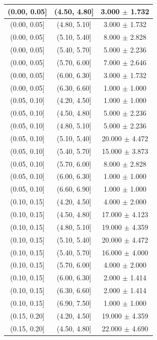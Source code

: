 \begin{longtable}{|c|c|c|}
\hline
\endlastfoot
(0.00, 0.05] & (4.50, 4.80] & 3.000 $\pm$ 1.732 \\ 
\hline
(0.00, 0.05] & (4.80, 5.10] & 3.000 $\pm$ 1.732 \\ 
\hline
(0.00, 0.05] & (5.10, 5.40] & 8.000 $\pm$ 2.828 \\ 
\hline
(0.00, 0.05] & (5.40, 5.70] & 5.000 $\pm$ 2.236 \\ 
\hline
(0.00, 0.05] & (5.70, 6.00] & 7.000 $\pm$ 2.646 \\ 
\hline
(0.00, 0.05] & (6.00, 6.30] & 3.000 $\pm$ 1.732 \\ 
\hline
(0.00, 0.05] & (6.30, 6.60] & 1.000 $\pm$ 1.000 \\ 
\hline
(0.05, 0.10] & (4.20, 4.50] & 1.000 $\pm$ 1.000 \\ 
\hline
(0.05, 0.10] & (4.50, 4.80] & 5.000 $\pm$ 2.236 \\ 
\hline
(0.05, 0.10] & (4.80, 5.10] & 5.000 $\pm$ 2.236 \\ 
\hline
(0.05, 0.10] & (5.10, 5.40] & 20.000 $\pm$ 4.472 \\ 
\hline
(0.05, 0.10] & (5.40, 5.70] & 15.000 $\pm$ 3.873 \\ 
\hline
(0.05, 0.10] & (5.70, 6.00] & 8.000 $\pm$ 2.828 \\ 
\hline
(0.05, 0.10] & (6.00, 6.30] & 1.000 $\pm$ 1.000 \\ 
\hline
(0.05, 0.10] & (6.60, 6.90] & 1.000 $\pm$ 1.000 \\ 
\hline
(0.10, 0.15] & (4.20, 4.50] & 4.000 $\pm$ 2.000 \\ 
\hline
(0.10, 0.15] & (4.50, 4.80] & 17.000 $\pm$ 4.123 \\ 
\hline
(0.10, 0.15] & (4.80, 5.10] & 19.000 $\pm$ 4.359 \\ 
\hline
(0.10, 0.15] & (5.10, 5.40] & 20.000 $\pm$ 4.472 \\ 
\hline
(0.10, 0.15] & (5.40, 5.70] & 16.000 $\pm$ 4.000 \\ 
\hline
(0.10, 0.15] & (5.70, 6.00] & 4.000 $\pm$ 2.000 \\ 
\hline
(0.10, 0.15] & (6.00, 6.30] & 2.000 $\pm$ 1.414 \\ 
\hline
(0.10, 0.15] & (6.30, 6.60] & 2.000 $\pm$ 1.414 \\ 
\hline
(0.10, 0.15] & (6.90, 7.50] & 1.000 $\pm$ 1.000 \\ 
\hline
(0.15, 0.20] & (4.20, 4.50] & 19.000 $\pm$ 4.359 \\ 
\hline
(0.15, 0.20] & (4.50, 4.80] & 22.000 $\pm$ 4.690 \\ 
\hline

\end{longtable}
